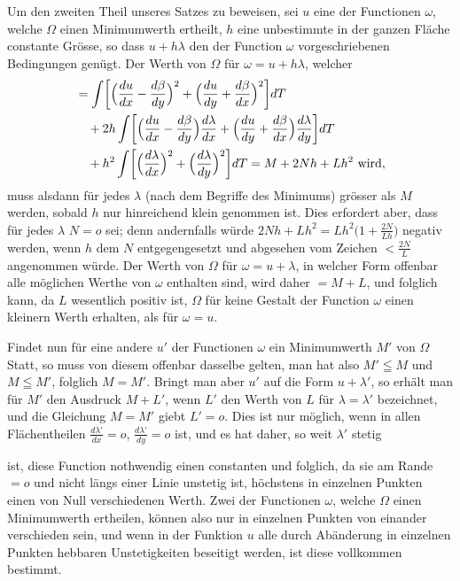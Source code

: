 \documentclass{article}
\begin{document}
Um den zweiten Theil unseres Satzes zu beweisen, sei $u$ eine der Functionen $\omega$, welche $\varOmega$ einen Minimumwerth ertheilt, $h$ eine unbestimmte in der ganzen Fläche constante Grösse, so dass $u + h\lambda$ den der Function $\omega$ vorgeschriebenen Bedingungen genügt. Der Werth von $\varOmega$ für $\omega = u + h\lambda$, welcher
\[
\begin{aligned}
&= \int \biggl[\Bigl(\frac{du}{dx} - \frac{d\beta}{dy}\Bigr)^2 + \Bigl(\frac{du}{dy} + \frac{d\beta}{dx}\Bigr)^2\biggr] dT \\
&\quad + 2h \int \biggl[\Bigl(\frac{du}{dx} - \frac{d\beta}{dy}\Bigr)\frac{d\lambda}{dx} + \Bigl(\frac{du}{dy} + \frac{d\beta}{dx}\Bigr)\frac{d\lambda}{dy}\biggr] dT \\
&\quad + h^2 \int \biggl[\Bigl(\frac{d\lambda}{dx}\Bigr)^2 + \Bigl(\frac{d\lambda}{dy}\Bigr)^2\biggr] dT = M + 2Nh + Lh^2 \text{ wird},
\end{aligned}
\]
muss alsdann für jedes $\lambda$ (nach dem Begriffe des Minimums) grösser als $M$ werden, sobald $h$ nur hinreichend klein genommen ist. Dies erfordert aber, dass für jedes $\lambda$ $N = o$ sei; denn andernfalls würde $2Nh + Lh^2 = Lh^2\bigl(1 + \frac{2N}{Lh}\bigr)$ negativ werden, wenn $h$ dem $N$ entgegengesetzt und abgesehen vom Zeichen $< \frac{2N}{L}$ angenommen würde. Der Werth von $\varOmega$ für $\omega = u + \lambda$, in welcher Form offenbar alle möglichen Werthe von $\omega$ enthalten sind, wird daher $= M + L$, und folglich kann, da $L$ wesentlich positiv ist, $\varOmega$ für keine Gestalt der Function $\omega$ einen kleinern Werth erhalten, als für $\omega = u$.

Findet nun für eine andere $u'$ der Functionen $\omega$ ein Minimumwerth $M'$ von $\varOmega$ Statt, so muss von diesem offenbar dasselbe gelten, man hat also $M' \leqq M$ und $M \leqq M'$, folglich $M = M'$. Bringt man aber $u'$ auf die Form $u + \lambda'$, so erhält man für $M'$ den Ausdruck $M + L'$, wenn $L'$ den Werth von $L$ für $\lambda = \lambda'$ bezeichnet, und die Gleichung $M = M'$ giebt $L' = o$. Dies ist nur möglich, wenn in allen Flächentheilen $\frac{d\lambda'}{dx} = o$, $\frac{d\lambda'}{dy} = o$ ist, und es hat daher, so weit $\lambda'$ stetig

ist, diese Function nothwendig einen constanten und folglich, da sie am Rande $= o$ und nicht längs einer Linie unstetig ist, höchstens in einzelnen Punkten einen von Null verschiedenen Werth. Zwei der Functionen $\omega$, welche $\varOmega$ einen Minimumwerth ertheilen, können also nur in einzelnen Punkten von einander verschieden sein, und wenn in der Funktion $u$ alle durch Abänderung in einzelnen Punkten hebbaren Unstetigkeiten beseitigt werden, ist diese vollkommen bestimmt.
\end{document}

